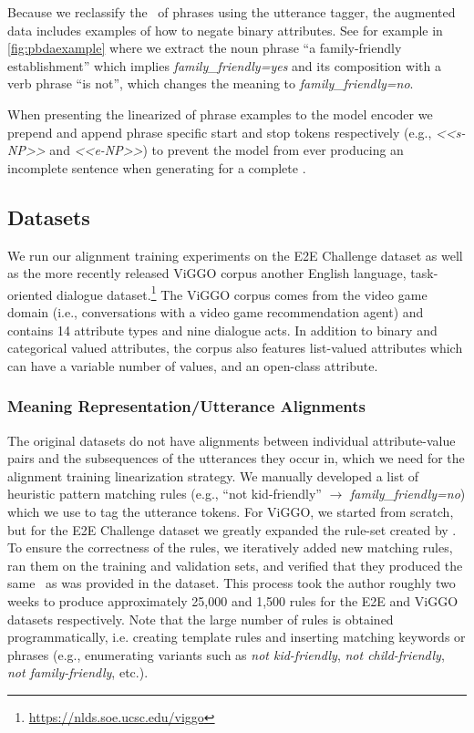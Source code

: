 Because we reclassify the \meaningrepresentation~of phrases using the utterance
tagger, the augmented  data includes examples of how to negate binary
attributes.  See for example in \autoref{fig:pbdaexample} where we extract the
noun phrase ``a family-friendly establishment'' which implies
\textit{family\_friendly=yes} and its composition with a verb phrase ``is
not'', which changes the meaning to \textit{family\_friendly=no}.

When presenting the linearized \meaningrepresentation of phrase examples to the
model encoder we prepend and append phrase specific start and stop tokens
respectively (e.g., \textit{<<s-NP>>} and \textit{<<e-NP>>}) to prevent the
model from ever producing an incomplete sentence when generating for a complete
\meaningrepresentation.

\subsection{Datasets}

We run our alignment training experiments on the E2E Challenge dataset as well
as the more recently released ViGGO corpus \citep{juraska2019} another English
language, task-oriented dialogue
dataset.\footnote{\url{https://nlds.soe.ucsc.edu/viggo}} The ViGGO corpus comes
from the video game domain (i.e., conversations with a video game
recommendation agent)  and  contains 14 attribute types and nine dialogue acts.
In addition to binary and categorical valued attributes, the corpus also
features list-valued attributes which can have a variable number of values, and
an open-class  attribute. 

\subsubsection{Meaning Representation/Utterance Alignments} \label{sec:align}

The original datasets do not have alignments between individual attribute-value
pairs and the subsequences of the utterances they occur in, which we need for
the alignment training linearization strategy.  We manually developed a list of
heuristic pattern matching rules (e.g., ``not kid-friendly'' $\rightarrow$
\textit{family\_friendly=no}) which we use to tag the utterance tokens.  For
ViGGO, we started from scratch, but for the E2E Challenge dataset we greatly
expanded the rule-set created by \citet{dusek2019}.  To ensure the correctness
of the rules, we iteratively added new matching rules, ran them on the training
and validation sets, and verified that they produced the same
\meaningrepresentation~as was provided in the dataset. This process took the
author roughly two weeks to produce approximately 25,000 and 1,500 rules for
the E2E and ViGGO datasets respectively. Note that the large number of rules is
obtained programmatically, i.e. creating template rules and inserting matching
keywords or phrases (e.g., enumerating variants such as \textit{not
kid-friendly}, \textit{not child-friendly}, \textit{not family-friendly},
etc.).

